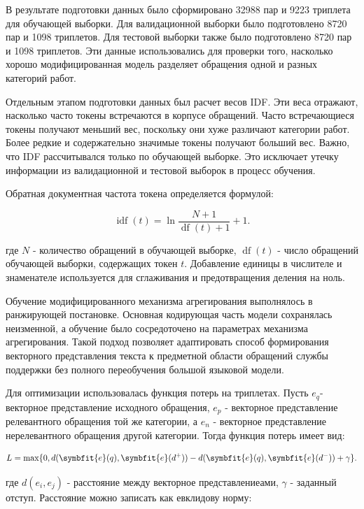 \documentclass[14pt,a4paper]{extarticle}
\numberwithin{figure}{section}
\numberwithin{table}{section}
\begin{document}
В результате подготовки данных было сформировано 32988 пар и 9223
триплета для обучающей выборки. Для валидационной выборки было
подготовлено 8720 пар и 1098 триплетов. Для тестовой выборки также было
подготовлено 8720 пар и 1098 триплетов. Эти данные использовались для
проверки того, насколько хорошо модифицированная модель разделяет
обращения одной и разных категорий работ.

Отдельным этапом подготовки данных был расчет весов IDF. Эти веса
отражают, насколько часто токены встречаются в корпусе обращений. Часто
встречающиеся токены получают меньший вес, поскольку они хуже различают
категории работ. Более редкие и содержательно значимые токены получают
больший вес. Важно, что IDF рассчитывался только по обучающей выборке.
Это исключает утечку информации из валидационной и тестовой выборок в
процесс обучения.

Обратная документная частота токена определяется формулой:

\begin{equation}\operatorname{idf}(t)=\ln\frac{N+1}{\operatorname{df}(t)+1}+1.\end{equation}

где \(N\) - количество обращений в обучающей выборке, \(\operatorname{df}(t)\) - число
обращений обучающей выборки, содержащих токен \(t\). Добавление единицы
в числителе и знаменателе используется для сглаживания и предотвращения
деления на ноль.

Обучение модифицированного механизма агрегирования выполнялось в
ранжирующей постановке. Основная кодирующая часть модели сохранялась
неизменной, а обучение было сосредоточено на параметрах
механизма агрегирования. Такой подход позволяет адаптировать способ
формирования векторного представления текста к предметной области обращений службы
поддержки без полного переобучения большой языковой модели.

Для оптимизации использовалась функция потерь на триплетах. Пусть
\(e_{q}\)- векторное представление исходного обращения, \(e_{p}\) - векторное представление
релевантного обращения той же категории, а \(e_{n}\) - векторное представление
нерелевантного обращения другой категории. Тогда функция потерь имеет
вид:

\begin{equation}L=\max\{0,d(\symbfit{e}(q),\symbfit{e}(d^+))-d(\symbfit{e}(q),\symbfit{e}(d^-))+\gamma\}.\label{eq:triplet-loss}\end{equation}

где \(d\left( e_{i},e_{j} \right)\) - расстояние между
векторное представлениеами, \(\gamma\) - заданный отступ. Расстояние можно
записать как евклидову норму:
\end{document}
